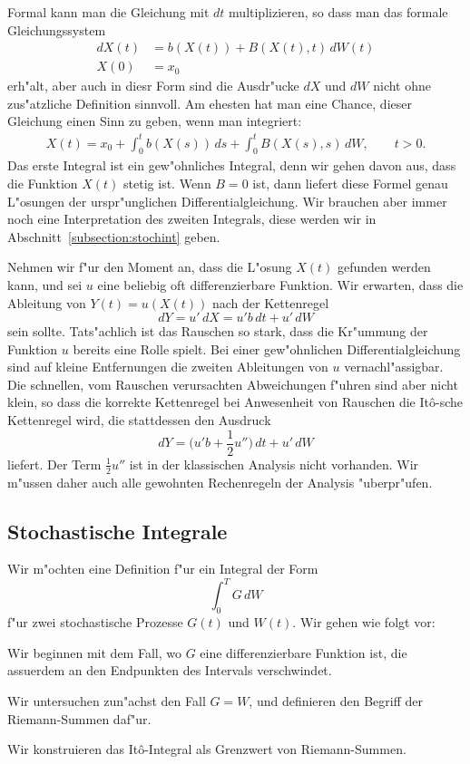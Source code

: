Formal kann man die Gleichung mit $dt$ multiplizieren, so dass man
das formale Gleichungssystem
\begin{align*}
dX(t)
&=
b(X(t)) + B(X(t),t)\,dW(t)
\\
X(0)
&=
x_0
\end{align*}
erh"alt, aber auch in diesr Form sind die Ausdr"ucke $dX$ und $dW$ nicht
ohne zus"atzliche Definition sinnvoll.
Am ehesten hat man eine Chance, dieser Gleichung einen Sinn zu geben,
wenn man integriert:
\begin{align*}
X(t)=x_0+\int_0^t b(X(s))\,ds + \int_0^t B(X(s), s)\, dW,\qquad t>0.
\end{align*}
Das erste Integral ist ein gew"ohnliches Integral, denn wir
gehen davon aus, dass die Funktion $X(t)$ stetig ist.
Wenn $B=0$ ist, dann liefert diese Formel genau L"osungen der
urspr"unglichen Differentialgleichung.
Wir brauchen aber immer noch eine Interpretation des zweiten Integrals,
diese werden wir in Abschnitt~\ref{subsection:stochint} geben.

Nehmen wir f"ur den Moment an, dass die L"osung $X(t)$ gefunden werden
kann, und sei $u$ eine beliebig oft differenzierbare Funktion.
Wir erwarten, dass die Ableitung von $Y(t)=u(X(t))$ nach der
Kettenregel
\[
dY = u'\,dX = u'b\,dt + u'\,dW
\]
sein sollte.
Tats"achlich ist das Rauschen so stark, dass die Kr"ummung der Funktion
$u$ bereits eine Rolle spielt.
Bei einer gew"ohnlichen Differentialgleichung sind auf kleine Entfernungen
die zweiten Ableitungen von $u$ vernachl"assigbar.
Die schnellen, vom Rauschen verursachten Abweichungen f"uhren sind aber nicht
klein, so dass die korrekte Kettenregel bei Anwesenheit von Rauschen die
It\^o-sche Kettenregel wird, die stattdessen den Ausdruck
\[
dY =  \biggl(u'b + \frac12u''\biggr)\,dt + u'\,dW
\]
liefert.
Der Term $\frac12u''$ ist in der klassischen Analysis nicht vorhanden.
Wir m"ussen daher auch alle gewohnten Rechenregeln der Analysis "uberpr"ufen.

\subsection{Stochastische Integrale\label{subsection:stochint}}
%
%
Wir m"ochten eine Definition f"ur ein Integral der Form
\[
\int_0^T G\,dW
\]
f"ur zwei stochastische Prozesse $G(t)$ und $W(t)$.
Wir gehen wie folgt vor:
\begin{compactenum}
\item Wir beginnen mit dem Fall, wo $G$ eine differenzierbare Funktion
ist, die assuerdem an den Endpunkten des Intervals verschwindet.
\item Wir untersuchen zun"achst den Fall $G=W$, und definieren den
Begriff der Riemann-Summen daf"ur.
\item Wir konstruieren das It\^o-Integral als Grenzwert von Riemann-Summen.
\end{compactenum}


